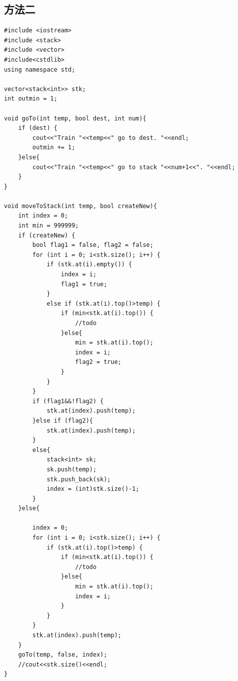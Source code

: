 \documentclass[12pt,UTF8]{ctexart}
\begin{document}
\subsection{方法二}
\begin{lstlisting}
#include <iostream>
#include <stack>
#include <vector>
#include<cstdlib>
using namespace std;

vector<stack<int>> stk;
int outmin = 1;

void goTo(int temp, bool dest, int num){
    if (dest) {
        cout<<"Train "<<temp<<" go to dest. "<<endl;
        outmin += 1;
    }else{
        cout<<"Train "<<temp<<" go to stack "<<num+1<<". "<<endl;
    }
}

void moveToStack(int temp, bool createNew){
    int index = 0;
    int min = 999999;
    if (createNew) {
        bool flag1 = false, flag2 = false;
        for (int i = 0; i<stk.size(); i++) {
            if (stk.at(i).empty()) {
                index = i;
                flag1 = true;
            }
            else if (stk.at(i).top()>temp) {
                if (min<stk.at(i).top()) {
                    //todo
                }else{
                    min = stk.at(i).top();
                    index = i;
                    flag2 = true;
                }
            }
        }
        if (flag1&&!flag2) {
            stk.at(index).push(temp);
        }else if (flag2){
            stk.at(index).push(temp);
        }
        else{
            stack<int> sk;
            sk.push(temp);
            stk.push_back(sk);
            index = (int)stk.size()-1;
        }
    }else{
        
        index = 0;
        for (int i = 0; i<stk.size(); i++) {
            if (stk.at(i).top()>temp) {
                if (min<stk.at(i).top()) {
                    //todo
                }else{
                    min = stk.at(i).top();
                    index = i;
                }
            }
        }
        stk.at(index).push(temp);
    }
    goTo(temp, false, index);
    //cout<<stk.size()<<endl;
}


\end{lstlisting}
\end{document}
